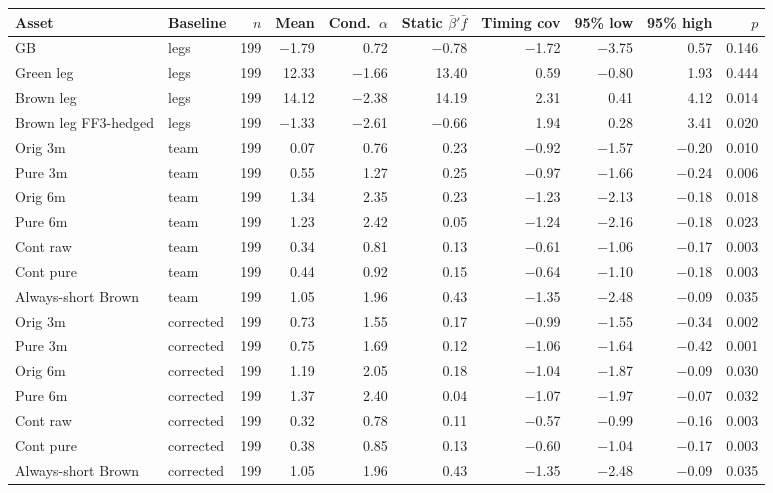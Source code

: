 \begin{tabular}{llrrrrrrrr}
\toprule
Asset & Baseline & $n$ & Mean & Cond.\ $\alpha$ & Static $\bar\beta'\bar f$ & Timing cov & 95\% low & 95\% high & $p$ \\
\midrule
GB & legs & 199 & $-$1.79 & 0.72 & $-$0.78 & $-$1.72 & $-$3.75 & 0.57 & 0.146 \\
Green leg & legs & 199 & 12.33 & $-$1.66 & 13.40 & 0.59 & $-$0.80 & 1.93 & 0.444 \\
Brown leg & legs & 199 & 14.12 & $-$2.38 & 14.19 & 2.31 & 0.41 & 4.12 & 0.014 \\
Brown leg FF3-hedged & legs & 199 & $-$1.33 & $-$2.61 & $-$0.66 & 1.94 & 0.28 & 3.41 & 0.020 \\
Orig 3m & team & 199 & 0.07 & 0.76 & 0.23 & $-$0.92 & $-$1.57 & $-$0.20 & 0.010 \\
Pure 3m & team & 199 & 0.55 & 1.27 & 0.25 & $-$0.97 & $-$1.66 & $-$0.24 & 0.006 \\
Orig 6m & team & 199 & 1.34 & 2.35 & 0.23 & $-$1.23 & $-$2.13 & $-$0.18 & 0.018 \\
Pure 6m & team & 199 & 1.23 & 2.42 & 0.05 & $-$1.24 & $-$2.16 & $-$0.18 & 0.023 \\
Cont raw & team & 199 & 0.34 & 0.81 & 0.13 & $-$0.61 & $-$1.06 & $-$0.17 & 0.003 \\
Cont pure & team & 199 & 0.44 & 0.92 & 0.15 & $-$0.64 & $-$1.10 & $-$0.18 & 0.003 \\
Always-short Brown & team & 199 & 1.05 & 1.96 & 0.43 & $-$1.35 & $-$2.48 & $-$0.09 & 0.035 \\
Orig 3m & corrected & 199 & 0.73 & 1.55 & 0.17 & $-$0.99 & $-$1.55 & $-$0.34 & 0.002 \\
Pure 3m & corrected & 199 & 0.75 & 1.69 & 0.12 & $-$1.06 & $-$1.64 & $-$0.42 & 0.001 \\
Orig 6m & corrected & 199 & 1.19 & 2.05 & 0.18 & $-$1.04 & $-$1.87 & $-$0.09 & 0.030 \\
Pure 6m & corrected & 199 & 1.37 & 2.40 & 0.04 & $-$1.07 & $-$1.97 & $-$0.07 & 0.032 \\
Cont raw & corrected & 199 & 0.32 & 0.78 & 0.11 & $-$0.57 & $-$0.99 & $-$0.16 & 0.003 \\
Cont pure & corrected & 199 & 0.38 & 0.85 & 0.13 & $-$0.60 & $-$1.04 & $-$0.17 & 0.003 \\
Always-short Brown & corrected & 199 & 1.05 & 1.96 & 0.43 & $-$1.35 & $-$2.48 & $-$0.09 & 0.035 \\
\bottomrule
\end{tabular}
